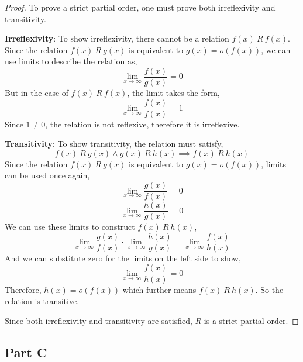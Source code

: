 \documentclass{article}
\begin{document}
\begin{proof}
  To prove a strict partial order, one must prove both irreflexivity and
  transitivity. 

  \bigbreak

  \textbf{Irreflexivity}: To show irreflexivity, there cannot be a relation
  $f(x)\ R\ f(x)$. Since the relation $f(x)\ R\ g(x)$ is equivalent to $g(x) =
  o(f(x))$, we can use limits to describe the relation as,
  $$ \lim_{x \to \infty} \frac{f(x)}{g(x)} = 0$$
  But in the case of $f(x)\ R\ f(x)$, the limit takes the form,
  $$ \lim_{x \to \infty} \frac{f(x)}{f(x)} = 1$$
  Since $1 \neq 0$, the relation is not reflexive, therefore it is irreflexive.

  \bigbreak

  \textbf{Transitivity}: To show transitivity, the relation must satisfy,
  $$ f(x)\ R\ g(x) \land g(x)\ R\ h(x) \implies f(x)\ R\ h(x) $$
  Since the relation $f(x)\ R\ g(x)$ is equivalent to $g(x) = o(f(x))$, limits
  can be used once again,
  $$ \lim_{x \to \infty} \frac{g(x)}{f(x)} = 0 $$
  $$ \lim_{x \to \infty} \frac{h(x)}{g(x)} = 0 $$
  We can use these limits to construct $f(x)\ R\ h(x)$,
  $$ \lim_{x \to \infty} \frac{g(x)}{f(x)} \cdot \lim_{x \to \infty}
  \frac{h(x)}{g(x)} = \lim_{x \to \infty} \frac{f(x)}{h(x)} $$
  And we can substitute zero for the limits on the left side to show,
  $$ \lim_{x \to \infty} \frac{f(x)}{h(x)} = 0 $$
  Therefore, $h(x) = o(f(x))$ which further means $f(x)\ R\ h(x)$. So the
  relation is transitive.

  \bigbreak

  Since both irreflexivity and transitivity are satisfied, $R$ is a strict
  partial order.
\end{proof}

\break

\subsection*{Part C}
\end{document}
